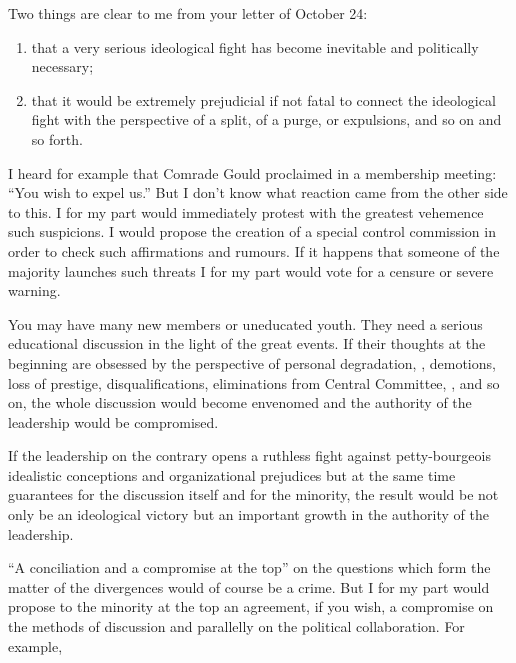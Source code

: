 

\noindent
Two things are clear to me from your letter of October 24:

\begin{enumerate}
  \item that a very serious ideological fight has become inevitable and politically necessary;
  \item that it would be extremely prejudicial if not fatal to connect the ideological fight with the perspective of a split, of a purge, or expulsions, and so on and so forth.
\end{enumerate}

I heard for example that Comrade Gould proclaimed in a membership meeting: “You wish to expel us.” But I don’t know what reaction came from the other side to this. I for my part would immediately protest with the greatest vehemence such suspicions. I would propose the creation of a special control commission in order to check such affirmations and rumours. If it happens that someone of the majority launches such threats I for my part would vote for a censure or severe warning.

You may have many new members or uneducated youth. They need a serious educational discussion in the light of the great events. If their thoughts at the beginning are obsessed by the perspective of personal degradation, \ie, demotions, loss of prestige, disqualifications, eliminations from Central Committee, \etc, and so on, the whole discussion would become envenomed and the authority of the leadership would be compromised.

If the leadership on the contrary opens a ruthless fight against petty-bourgeois idealistic conceptions and organizational prejudices but at the same time guarantees for the discussion itself and for the minority, the result would be not only be an ideological victory but an important growth in the authority of the leadership.

“A conciliation and a compromise at the top” on the questions which form the matter of the divergences would of course be a crime. But I for my part would propose to the minority at the top an agreement, if you wish, a compromise on the methods of discussion and parallelly on the political collaboration. For example,

